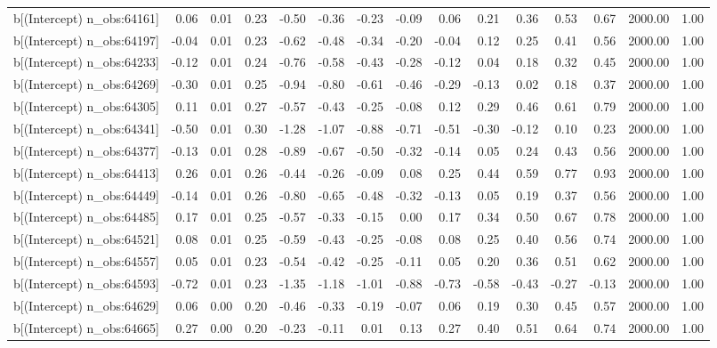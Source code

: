 \begin{table}[ht]
\begin{tabular}{rrrrrrrrrrrrrrr}
  b[(Intercept) n\_obs:64161] & 0.06 & 0.01 & 0.23 & -0.50 & -0.36 & -0.23 & -0.09 & 0.06 & 0.21 & 0.36 & 0.53 & 0.67 & 2000.00 & 1.00 \\ 
  b[(Intercept) n\_obs:64197] & -0.04 & 0.01 & 0.23 & -0.62 & -0.48 & -0.34 & -0.20 & -0.04 & 0.12 & 0.25 & 0.41 & 0.56 & 2000.00 & 1.00 \\ 
  b[(Intercept) n\_obs:64233] & -0.12 & 0.01 & 0.24 & -0.76 & -0.58 & -0.43 & -0.28 & -0.12 & 0.04 & 0.18 & 0.32 & 0.45 & 2000.00 & 1.00 \\ 
  b[(Intercept) n\_obs:64269] & -0.30 & 0.01 & 0.25 & -0.94 & -0.80 & -0.61 & -0.46 & -0.29 & -0.13 & 0.02 & 0.18 & 0.37 & 2000.00 & 1.00 \\ 
  b[(Intercept) n\_obs:64305] & 0.11 & 0.01 & 0.27 & -0.57 & -0.43 & -0.25 & -0.08 & 0.12 & 0.29 & 0.46 & 0.61 & 0.79 & 2000.00 & 1.00 \\ 
  b[(Intercept) n\_obs:64341] & -0.50 & 0.01 & 0.30 & -1.28 & -1.07 & -0.88 & -0.71 & -0.51 & -0.30 & -0.12 & 0.10 & 0.23 & 2000.00 & 1.00 \\ 
  b[(Intercept) n\_obs:64377] & -0.13 & 0.01 & 0.28 & -0.89 & -0.67 & -0.50 & -0.32 & -0.14 & 0.05 & 0.24 & 0.43 & 0.56 & 2000.00 & 1.00 \\ 
  b[(Intercept) n\_obs:64413] & 0.26 & 0.01 & 0.26 & -0.44 & -0.26 & -0.09 & 0.08 & 0.25 & 0.44 & 0.59 & 0.77 & 0.93 & 2000.00 & 1.00 \\ 
  b[(Intercept) n\_obs:64449] & -0.14 & 0.01 & 0.26 & -0.80 & -0.65 & -0.48 & -0.32 & -0.13 & 0.05 & 0.19 & 0.37 & 0.56 & 2000.00 & 1.00 \\ 
  b[(Intercept) n\_obs:64485] & 0.17 & 0.01 & 0.25 & -0.57 & -0.33 & -0.15 & 0.00 & 0.17 & 0.34 & 0.50 & 0.67 & 0.78 & 2000.00 & 1.00 \\ 
  b[(Intercept) n\_obs:64521] & 0.08 & 0.01 & 0.25 & -0.59 & -0.43 & -0.25 & -0.08 & 0.08 & 0.25 & 0.40 & 0.56 & 0.74 & 2000.00 & 1.00 \\ 
  b[(Intercept) n\_obs:64557] & 0.05 & 0.01 & 0.23 & -0.54 & -0.42 & -0.25 & -0.11 & 0.05 & 0.20 & 0.36 & 0.51 & 0.62 & 2000.00 & 1.00 \\ 
  b[(Intercept) n\_obs:64593] & -0.72 & 0.01 & 0.23 & -1.35 & -1.18 & -1.01 & -0.88 & -0.73 & -0.58 & -0.43 & -0.27 & -0.13 & 2000.00 & 1.00 \\ 
  b[(Intercept) n\_obs:64629] & 0.06 & 0.00 & 0.20 & -0.46 & -0.33 & -0.19 & -0.07 & 0.06 & 0.19 & 0.30 & 0.45 & 0.57 & 2000.00 & 1.00 \\ 
  b[(Intercept) n\_obs:64665] & 0.27 & 0.00 & 0.20 & -0.23 & -0.11 & 0.01 & 0.13 & 0.27 & 0.40 & 0.51 & 0.64 & 0.74 & 2000.00 & 1.00 \\ 

\end{tabular}
\end{table}
